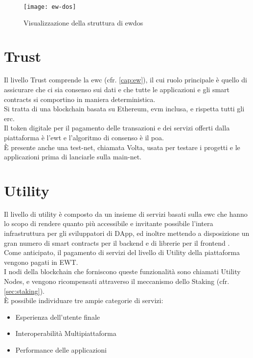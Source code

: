 \begin{figure}[h]
    \texttt{[image: ew-dos]}
    \centering
    \caption{Visualizzazione della struttura di \gls{ewdos} \cite{img:ew-dos}}
    \label{lab:ew-dos}
\end{figure}

\section{Trust}
Il livello Trust comprende la \gls{ewc} (cfr. \autoref{cap:ew}), 
il cui ruolo principale è quello di assicurare che ci sia consenso sui dati e che tutte le applicazioni e gli smart contracts si comportino in maniera deterministica. \\
Si tratta di una blockchain basata su Ethereum, \gls{evm} inclusa, e rispetta tutti gli \gls{erc}. \\
Il token digitale per il pagamento delle transazioni e dei servizi offerti dalla piattaforma è l'\gls{ewt} e l'algoritmo di consenso è il \gls{poa}. \\
È presente anche una test-net, chiamata Volta, usata per testare i progetti e le applicazioni prima di lanciarle sulla main-net. 

\section{Utility}
Il livello di utility è composto da un insieme di servizi basati sulla \gls{ewc} che hanno lo scopo di rendere quanto più accessibile e invitante possibile l'intera infrastruttura per gli sviluppatori di DApp,
ed inoltre mettendo a disposizione un gran numero di smart contracts per il backend e di librerie per il frontend \cite{art:ew-dos}. \\
Come anticipato, il pagamento di servizi del livello di Utility della piattaforma vengono pagati in EWT. \\
I nodi della blockchain che forniscono queste funzionalità sono chiamati Utility Nodes, e vengono ricompensati attraverso il meccanismo dello Staking (cfr. \autoref{sec:staking}).\\

È possibile individuare tre ampie categorie di servizi:
\begin{itemize}
    \item Esperienza dell'utente finale
    \item Interoperabilità Multipiattaforma
    \item Performance delle applicazioni
\end{itemize}

